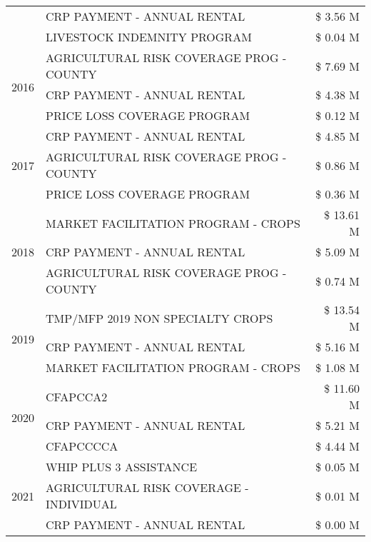 \begin{tabular}{llr}
 & CRP PAYMENT - ANNUAL RENTAL & \$ 3.56 M \\
 & LIVESTOCK INDEMNITY PROGRAM & \$ 0.04 M \\
\cline{1-3}
\multirow[t]{3}{*}{2016} & AGRICULTURAL RISK COVERAGE PROG - COUNTY & \$ 7.69 M \\
 & CRP PAYMENT - ANNUAL RENTAL & \$ 4.38 M \\
 & PRICE LOSS COVERAGE PROGRAM & \$ 0.12 M \\
\cline{1-3}
\multirow[t]{3}{*}{2017} & CRP PAYMENT - ANNUAL RENTAL & \$ 4.85 M \\
 & AGRICULTURAL RISK COVERAGE PROG - COUNTY & \$ 0.86 M \\
 & PRICE LOSS COVERAGE PROGRAM & \$ 0.36 M \\
\cline{1-3}
\multirow[t]{3}{*}{2018} & MARKET FACILITATION PROGRAM - CROPS & \$ 13.61 M \\
 & CRP PAYMENT - ANNUAL RENTAL & \$ 5.09 M \\
 & AGRICULTURAL RISK COVERAGE PROG - COUNTY & \$ 0.74 M \\
\cline{1-3}
\multirow[t]{3}{*}{2019} & TMP/MFP 2019 NON SPECIALTY CROPS & \$ 13.54 M \\
 & CRP PAYMENT - ANNUAL RENTAL & \$ 5.16 M \\
 & MARKET FACILITATION PROGRAM - CROPS & \$ 1.08 M \\
\cline{1-3}
\multirow[t]{3}{*}{2020} & CFAPCCA2 & \$ 11.60 M \\
 & CRP PAYMENT - ANNUAL RENTAL & \$ 5.21 M \\
 & CFAPCCCCA & \$ 4.44 M \\
\cline{1-3}
\multirow[t]{3}{*}{2021} & WHIP PLUS 3 ASSISTANCE & \$ 0.05 M \\
 & AGRICULTURAL RISK COVERAGE - INDIVIDUAL & \$ 0.01 M \\
 & CRP PAYMENT - ANNUAL RENTAL & \$ 0.00 M \\
\cline{1-3}
\bottomrule
\end{tabular}
